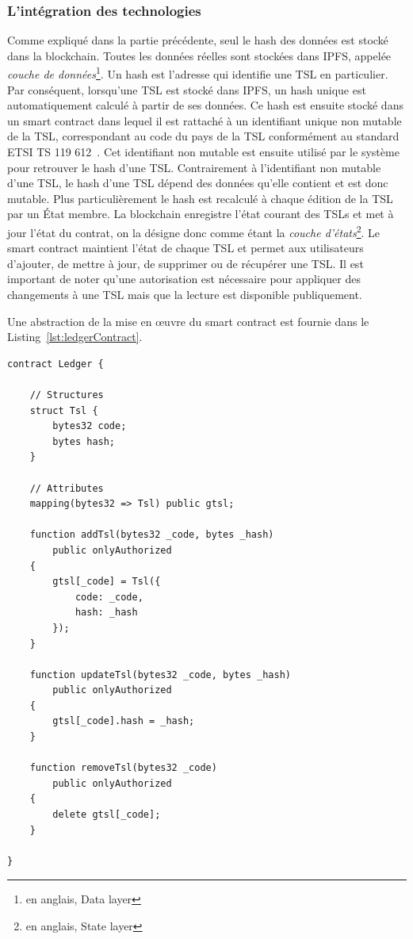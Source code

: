 \documentclass{tnreport}
\begin{document}
\subsubsection{L'intégration des technologies}

Comme expliqué dans la partie précédente, seul le hash des données est stocké dans la blockchain.
Toutes les données réelles sont stockées dans IPFS, appelée {\em couche de données}\footnote{en anglais, Data layer}. 
Un hash est l'adresse qui identifie une TSL en particulier. 
Par conséquent, lorsqu'une TSL est stocké dans IPFS, un hash unique est automatiquement calculé à partir de ses données. 
Ce hash est ensuite stocké dans un smart contract dans lequel il est rattaché à un identifiant unique non mutable de la TSL, correspondant au code du pays de la TSL conformément au standard ETSI TS 119 612~\cite{ETSITS119612}.
Cet identifiant non mutable est ensuite utilisé par le système pour retrouver le hash d'une TSL.
Contrairement à l'identifiant non mutable d'une TSL, le hash d'une TSL dépend des données qu'elle contient et est donc mutable. 
Plus particulièrement le hash est recalculé à chaque édition de la TSL par un État membre.
La blockchain enregistre l'état courant des TSLs et met à jour l'état du contrat, on la désigne donc comme étant la {\em couche d'états}\footnote{en anglais, State layer}. 
Le smart contract maintient l'état de chaque TSL et permet aux utilisateurs d'ajouter, de mettre à jour, de supprimer ou de récupérer une TSL.
Il est important de noter qu'une autorisation est nécessaire pour appliquer des changements à une TSL mais que la lecture est disponible publiquement.

Une abstraction de la mise en œuvre du smart contract est fournie dans le Listing~\ref{lst:ledgerContract}.

\clearpage
\begin{lstlisting}[language=solidity, basicstyle=\small, caption={Ledger Contract}, label={lst:ledgerContract}]
contract Ledger {
	
	// Structures
	struct Tsl {
		bytes32 code;
		bytes hash;
	}
	
	// Attributes
	mapping(bytes32 => Tsl) public gtsl;
	
	function addTsl(bytes32 _code, bytes _hash)
		public onlyAuthorized
	{
		gtsl[_code] = Tsl({
			code: _code, 
			hash: _hash
		});
	}
	
	function updateTsl(bytes32 _code, bytes _hash)
		public onlyAuthorized
	{
		gtsl[_code].hash = _hash;
	}
	
	function removeTsl(bytes32 _code)
		public onlyAuthorized
	{
		delete gtsl[_code];
	}
	
}
\end{lstlisting}
\end{document}
